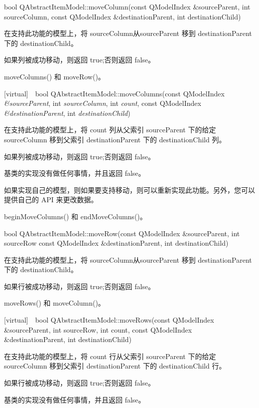 bool QAbstractItemModel::moveColumn(const QModelIndex \&sourceParent, int sourceColumn, const QModelIndex \&destinationParent, int destinationChild)

在支持此功能的模型上，将 sourceColumn从sourceParent 移到 destinationParent 下的 destinationChild。

如果列被成功移动，则返回 true;否则返回 false。

\begin{seeAlso}
moveColumns() 和 moveRow()。
\end{seeAlso}

[virtual] bool QAbstractItemModel::moveColumns(const QModelIndex \emph{\&sourceParent}, int \emph{sourceColumn}, int \emph{count}, const QModelIndex \emph{\&destinationParent}, int \emph{destinationChild})

在支持此功能的模型上，将 count 列从父索引 sourceParent 下的给定 sourceColumn 移到父索引 destinationParent 下的 destinationChild 列。

如果列被成功移动，则返回 true;否则返回 false。

基类的实现没有做任何事情，并且返回 false。

如果实现自己的模型，则如果要支持移动，则可以重新实现此功能。另外，您可以提供自己的 API 来更改数据。

\begin{seeAlso}
beginMoveColumns() 和 endMoveColumns()。
\end{seeAlso}

bool QAbstractItemModel::moveRow(const QModelIndex \&sourceParent, int sourceRow const QModelIndex \&destinationParent, int destinationChild)

在支持此功能的模型上，将 sourceColumn从sourceParent 移到 destinationParent 下的 destinationChild。

如果行被成功移动，则返回 true;否则返回 false。

\begin{seeAlso}
moveRows() 和 moveColumn()。
\end{seeAlso}

[virtual] bool QAbstractItemModel::moveRows(const QModelIndex \&sourceParent, int sourceRow, int count, const QModelIndex \&destinationParent, int destinationChild)

在支持此功能的模型上，将 count 行从父索引 sourceParent 下的给定 sourceColumn 移到父索引 destinationParent 下的 destinationChild 行。

如果行被成功移动，则返回 true;否则返回 false。

基类的实现没有做任何事情，并且返回 false。

